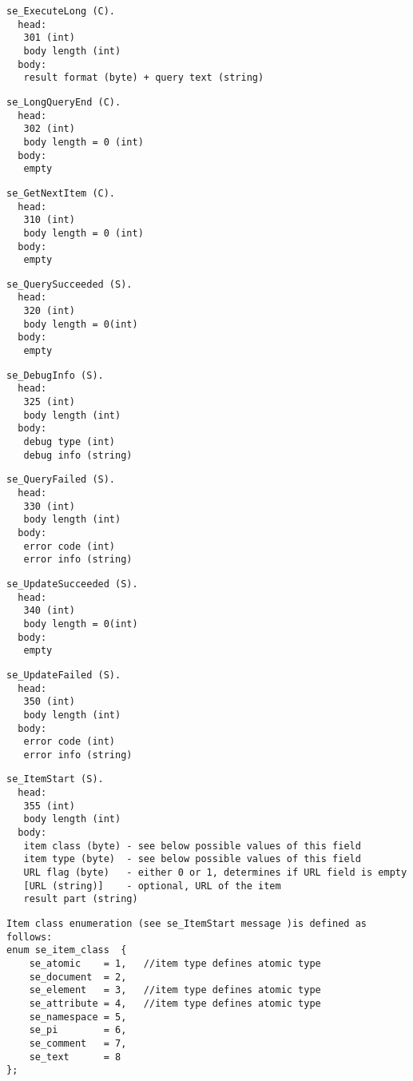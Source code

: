 \documentclass[a4paper,12pt]{article}
\begin{document}
\begin{verbatim}
se_ExecuteLong (C).
  head:
   301 (int)
   body length (int)
  body:
   result format (byte) + query text (string)
\end{verbatim}

\begin{verbatim}
se_LongQueryEnd (C).
  head:
   302 (int)
   body length = 0 (int)
  body:
   empty
\end{verbatim}

\begin{verbatim}
se_GetNextItem (C).
  head:
   310 (int)
   body length = 0 (int)
  body:
   empty
\end{verbatim}

\begin{verbatim}
se_QuerySucceeded (S).
  head:
   320 (int)
   body length = 0(int)
  body:
   empty
\end{verbatim}

\begin{verbatim}
se_DebugInfo (S).
  head:
   325 (int)
   body length (int)
  body:
   debug type (int)
   debug info (string)
\end{verbatim}

\begin{verbatim}
se_QueryFailed (S).
  head:
   330 (int)
   body length (int)
  body:
   error code (int)
   error info (string)
\end{verbatim}

\begin{verbatim}
se_UpdateSucceeded (S).
  head:
   340 (int)
   body length = 0(int)
  body:
   empty
\end{verbatim}

\begin{verbatim}
se_UpdateFailed (S).
  head:
   350 (int)
   body length (int)
  body:
   error code (int)
   error info (string)
\end{verbatim}

\begin{verbatim}
se_ItemStart (S).
  head:
   355 (int)
   body length (int)
  body:
   item class (byte) - see below possible values of this field
   item type (byte)  - see below possible values of this field
   URL flag (byte)   - either 0 or 1, determines if URL field is empty
   [URL (string)]    - optional, URL of the item
   result part (string)
\end{verbatim}

\begin{verbatim}
Item class enumeration (see se_ItemStart message )is defined as follows:
enum se_item_class  {
    se_atomic    = 1,   //item type defines atomic type
    se_document  = 2,
    se_element   = 3,   //item type defines atomic type
    se_attribute = 4,   //item type defines atomic type
    se_namespace = 5,
    se_pi        = 6,
    se_comment   = 7,
    se_text      = 8
};
\end{verbatim}
\end{document}
